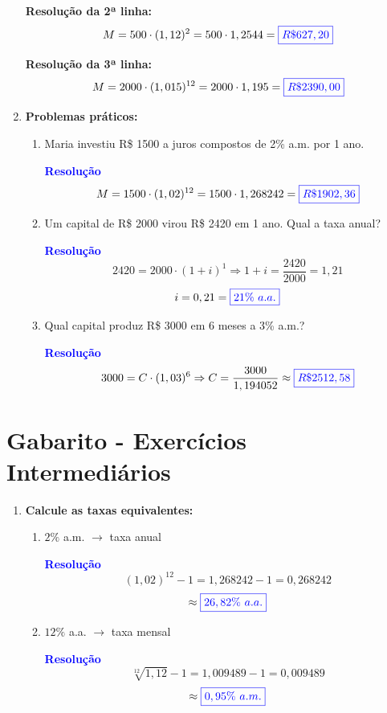 \documentclass[11pt]{article}
\newcommand{\resposta}[1]{\textcolor{blue}{\boxed{#1}}}
\begin{document}
\begin{multicols}{2}
\begin{enumerate}[leftmargin=*]
\textbf{Resolução da 2ª linha:}
\[
M = 500 \cdot (1,12)^2 = 500 \cdot 1,2544 = \resposta{R\$ 627,20}
\]

\textbf{Resolução da 3ª linha:}
\[
M = 2000 \cdot (1,015)^{12} = 2000 \cdot 1,195 = \resposta{R\$ 2390,00}
\]

\item \textbf{Problemas práticos:}

\begin{enumerate}[label=\alph*)]
\item Maria investiu R\$ 1500 a juros compostos de 2\% a.m. por 1 ano.

\textbf{\textcolor{blue}{Resolução}}
\[
M = 1500 \cdot (1,02)^{12} = 1500 \cdot 1,268242 = \resposta{R\$ 1902,36}
\]

\item Um capital de R\$ 2000 virou R\$ 2420 em 1 ano. Qual a taxa anual?

\textbf{\textcolor{blue}{Resolução}}
\[
2420 = 2000 \cdot (1 + i)^1 \Rightarrow 1 + i = \frac{2420}{2000} = 1,21
\]
\[
i = 0,21 = \resposta{21\%\ a.a.}
\]

\item Qual capital produz R\$ 3000 em 6 meses a 3\% a.m.?

\textbf{\textcolor{blue}{Resolução}}
\[
3000 = C \cdot (1,03)^6 \Rightarrow C = \frac{3000}{1,194052} \approx \resposta{R\$ 2512,58}
\]
\end{enumerate}
\end{enumerate}

\section*{Gabarito - Exercícios Intermediários}

\begin{enumerate}[leftmargin=*, start=5]

\item \textbf{Calcule as taxas equivalentes:}

\begin{enumerate}[label=\alph*)]
\item $2\%$ a.m. $\rightarrow$ taxa anual

\textbf{\textcolor{blue}{Resolução}}
\[
    (1,02)^{12} - 1 = 1,268242 - 1 = 0,268242 \]
\[\approx \resposta{26,82\%\ a.a.}\]

\item $12\%$ a.a. $\rightarrow$ taxa mensal

\textbf{\textcolor{blue}{Resolução}}
\[
    \sqrt[12]{1,12} - 1 = 1,009489 - 1 = 0,009489 \]
\[\approx \resposta{0,95\%\ a.m.} \]


\end{enumerate}
\end{enumerate}
\end{multicols}
\end{document}
